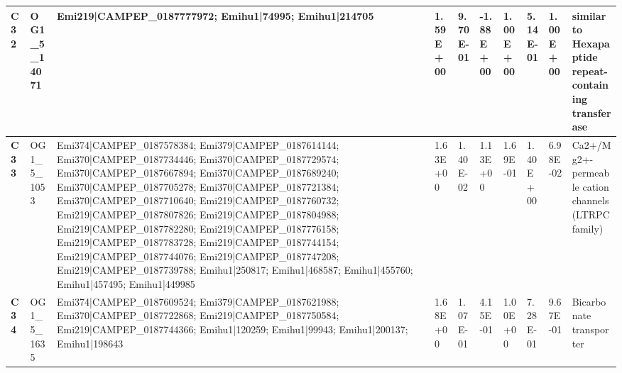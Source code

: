 \begin{landscape}
\begin{center}
\begin{footnotesize}
\begin{longtable}{|p{0.5cm}|p{1.5cm}|p{4cm}|l|l|l|l|l|l|l|}
\textbf{C32} & OG1\_5\_14071 & Emi219|CAMPEP\_0187777972; Emihu1|74995; Emihu1|214705                                                                                                                                                                                                                                                                                                                                                                                                                                                                                                                                                                                   & 1.59E+00  & 9.70E-01 & -1.88E+00 & 1.00E+00 & 5.14E-01  & 1.00E+00 & similar to Hexapaptide repeat-containing transferase                         \\ \hline
\textbf{C33} & OG1\_5\_1053  & Emi374|CAMPEP\_0187578384; Emi379|CAMPEP\_0187614144; Emi370|CAMPEP\_0187734446; Emi370|CAMPEP\_0187729574; Emi370|CAMPEP\_0187667894; Emi370|CAMPEP\_0187689240; Emi370|CAMPEP\_0187705278; Emi370|CAMPEP\_0187721384; Emi370|CAMPEP\_0187710640; Emi219|CAMPEP\_0187760732; Emi219|CAMPEP\_0187807826; Emi219|CAMPEP\_0187804988; Emi219|CAMPEP\_0187782280; Emi219|CAMPEP\_0187776158; Emi219|CAMPEP\_0187783728; Emi219|CAMPEP\_0187744154; Emi219|CAMPEP\_0187744076; Emi219|CAMPEP\_0187747208; Emi219|CAMPEP\_0187739788; Emihu1|250817; Emihu1|468587; Emihu1|455760; Emihu1|457495; Emihu1|449985                               & 1.63E+00  & 1.40E-02 & 1.13E+00  & 1.69E-01 & 1.40E+00  & 6.98E-02 & Ca2+/Mg2+-permeable cation channels (LTRPC family)                           \\ \hline
\textbf{C34} & OG1\_5\_1635  & Emi374|CAMPEP\_0187609524; Emi379|CAMPEP\_0187621988; Emi370|CAMPEP\_0187722868; Emi219|CAMPEP\_0187750584; Emi219|CAMPEP\_0187744366; Emihu1|120259; Emihu1|99943; Emihu1|200137; Emihu1|198643                                                                                                                                                                                                                                                                                                                                                                                                                                         & 1.68E+00  & 1.07E-01 & 4.15E-01  & 1.00E+00 & 7.28E-01  & 9.67E-01 & Bicarbonate transporter                                                      \\ \hline

\end{longtable}
\end{footnotesize}
\end{center}
\end{landscape}

